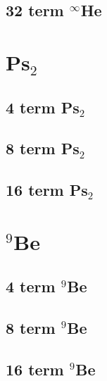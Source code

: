 \documentclass[12pt,thmsa,suthesis,verbatim]{report}
\begin{document}
\subsection{32 term $^\infty $He}

\section{Ps$_2$}

\subsection{4 term Ps$_2$}

{\normalsize \renewcommand{\baselinestretch}{1} \footnotesize %
 }

\subsection{8 term Ps$_2$}

{\normalsize \renewcommand{\baselinestretch}{1} \footnotesize %
 }

\subsection{16 term Ps$_2$}

{\normalsize \renewcommand{\baselinestretch}{1} \footnotesize %
 }

\section{$^9$Be}

\subsection{4 term $^9$Be}

{\normalsize \renewcommand{\baselinestretch}{1} \footnotesize %
 }

\subsection{8 term $^9$Be}

{\normalsize \renewcommand{\baselinestretch}{1} \footnotesize %
 }

\subsection{16 term $^9$Be}
\end{document}
